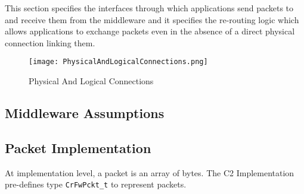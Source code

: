 \documentclass{pnp_article}
\begin{document}
This section specifies the interfaces through which applications send packets to and receive them from the middleware and it specifies the re-routing logic which allows applications to exchange packets even in the absence of a direct physical connection linking them. 

\begin{figure}[ht]
 \centering
 \texttt{[image: PhysicalAndLogicalConnections.png]}
 \caption{Physical And Logical Connections}
 \label{fig:PhysicalAndLogicalConnections}
\end{figure} 

\subsection{Middleware Assumptions}\label{sec:MwAssumptions}
 




\subsection{Packet Implementation}\label{sec:PcktImpl}

At implementation level, a packet is an array of bytes. The C2 Implementation pre-defines type \texttt{CrFwPckt\_t} to represent packets.
\end{document}
